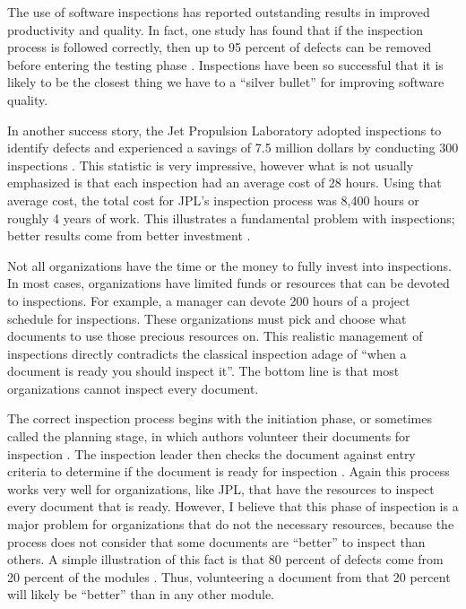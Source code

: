 \documentclass[11pt,twocolumn]{article}
\begin{document}
\label{sec:intro}
The use of software inspections has reported outstanding results in
improved productivity and quality. In fact, one study has found that if the
inspection process is followed correctly, then up to 95 percent of defects
can be removed before entering the testing phase \cite{Bush90}.
Inspections have been so successful that it is likely to be the closest
thing we have to a ``silver bullet'' for improving software quality.


In another success story, the Jet Propulsion Laboratory adopted inspections
to identify defects and experienced a savings of 7.5 million dollars by
conducting 300 inspections \cite{Bush90a}. This statistic is very
impressive, however what is not usually emphasized is that each inspection
had an average cost of 28 hours. Using that average cost, the total cost
for JPL's inspection process was 8,400 hours or roughly 4 years of work.
This illustrates a fundamental problem with inspections; better results
come from better investment \cite{Gilb93}.

Not all organizations have the time or the money to fully invest into
inspections. In most cases, organizations have limited funds or resources
that can be devoted to inspections. For example, a manager can devote 200
hours of a project schedule for inspections. These organizations must pick
and choose what documents to use those precious resources on.  This
realistic management of inspections directly contradicts the classical
inspection adage of ``when a document is ready you should inspect it''. The
bottom line is that most organizations cannot inspect every document.

The correct inspection process begins with the initiation phase, or
sometimes called the planning stage, in which authors volunteer their
documents for inspection \cite {Gilb93}. The inspection leader then checks
the document against entry criteria to determine if the document is ready
for inspection \cite{Ebenau94} \cite{Gilb93}. Again this process works very
well for organizations, like JPL, that have the resources to inspect every
document that is ready. However, I believe that this phase of inspection is
a major problem for organizations that do not the necessary resources,
because the process does not consider that some documents are ``better'' to
inspect than others. A simple illustration of this fact is that 80 percent
of defects come from 20 percent of the modules \cite{Boehm01}.  Thus,
volunteering a document from that 20 percent will likely be ``better'' than
in any other module.
\end{document}
